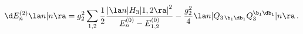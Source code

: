 \begin{equation}\label{de1}
\d E_n^{(2)}\la n|n\ra = g_2^2\sum_{1,2}
\frac{1}{2}\frac{\left|\la n|H_3|1,2\ra\right|^2}{E_n^{(0)}-E_{1,2}^{(0)}}
-\frac{g_2^2}{4}\la n|Q_{3\,\b_1\db_1}Q_3^{\b_1\db_1}|n\ra\,.
\end{equation}

